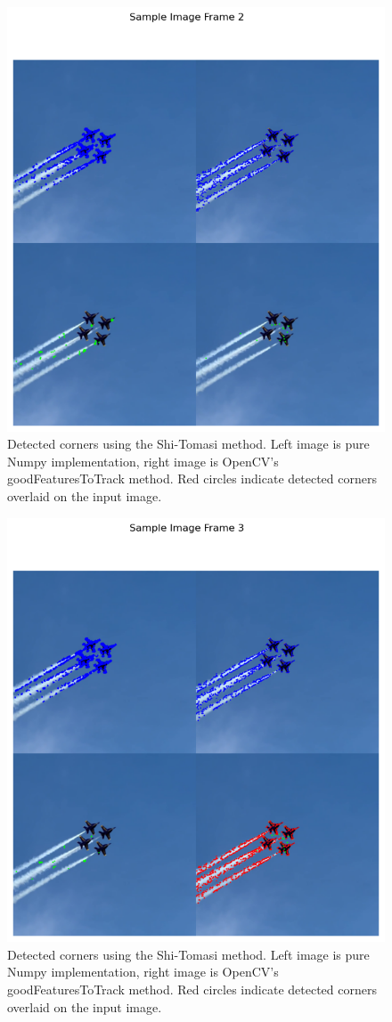 \documentclass[11pt, conference, letterpaper]{IEEEtran}
\begin{document}
\begin{figure}[h]
    \centering
    \includegraphics[width=0.5\linewidth]{images/sample_image_2.png}
    \caption{Detected corners using the Shi-Tomasi method. Left image is pure Numpy implementation, right image is OpenCV's goodFeaturesToTrack method. Red circles indicate detected corners overlaid on the input image.}
    \label{fig:sample_3}
\end{figure}


\begin{figure}[h]
    \centering
    \includegraphics[width=0.5\linewidth]{images/sample_image_3.png}
    \caption{Detected corners using the Shi-Tomasi method. Left image is pure Numpy implementation, right image is OpenCV's goodFeaturesToTrack method. Red circles indicate detected corners overlaid on the input image.}
    \label{fig:sample_4}
\end{figure}
\twocolumn
\end{document}
